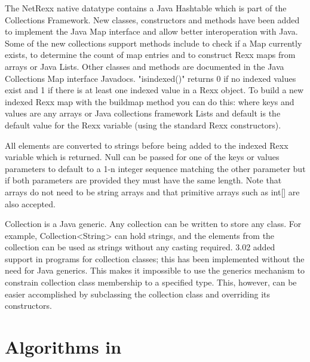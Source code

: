 {The NetRexx native \Rexx{} datatype contains a Java Hashtable which is
part of the Collections Framework. New classes, constructors and
methods have been added to implement the Java Map interface and allow
better interoperation with Java. Some of the new collections support
methods include  to check if a Map currently exists,
 to determine the count of map entries and
 to construct Rexx maps from arrays or
Java Lists. Other classes and methods are documented in the Java
Collections Map interface Javadocs. "isindexed()" returns 0 if no
indexed values exist and 1 if there is at least one indexed value in a
Rexx object. To build a new indexed Rexx map with the buildmap method
you can do this:  where
keys and values are any arrays or Java collections framework Lists and
default is the default value for the Rexx variable (using the standard
Rexx constructors). 

All elements are converted to strings before being added to the indexed Rexx variable which is returned. Null can be passed for one of the keys or values parameters to default to a 1-n integer sequence matching the other parameter but if both parameters are provided they must have the same length. Note that arrays do not need to be string arrays and that primitive arrays such as int[] are also accepted.
\begin{shaded}
Collection is a Java generic. Any collection can be written to store any
class. For example, Collection<String> can hold strings, and the
elements from the collection can be used as strings without any
casting required. \nr{} 3.02 added  support in
\nr{} programs for collection classes; this has been implemented
without the need for Java generics. This makes it impossible to use
the generics mechanism to constrain collection class membership to a
specified type. This, however, can be easier accomplished by
subclassing the collection class and overriding its constructors.
\end{shaded}



 

\chapter{Algorithms in \nr}{}
}
